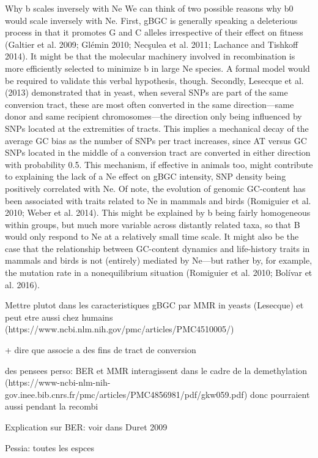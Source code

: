 Why b scales inversely with Ne
We can think of two possible reasons why b0 would scale inversely with Ne. First, gBGC is generally speaking a deleterious process in that it promotes G and C alleles irrespective of their effect on fitness (Galtier et al. 2009; Glémin 2010; Necşulea et al. 2011; Lachance and Tishkoff 2014). It might be that the molecular machinery involved in recombination is more efficiently selected to minimize b in large Ne species. A formal model would be required to validate this verbal hypothesis, though. Secondly, Lesecque et al. (2013) demonstrated that in yeast, when several SNPs are part of the same conversion tract, these are most often converted in the same direction—same donor and same recipient chromosomes—the direction only being influenced by SNPs located at the extremities of tracts. This implies a mechanical decay of the average GC bias as the number of SNPs per tract increases, since AT versus GC SNPs located in the middle of a conversion tract are converted in either direction with probability 0.5. This mechanism, if effective in animals too, might contribute to explaining the lack of a Ne effect on gBGC intensity, SNP density being positively correlated with Ne. Of note, the evolution of genomic GC-content has been associated with traits related to Ne in mammals and birds (Romiguier et al. 2010; Weber et al. 2014). This might be explained by b being fairly homogeneous within groups, but much more variable across distantly related taxa, so that B would only respond to Ne at a relatively small time scale. It might also be the case that the relationship between GC-content dynamics and life-history traits in mammals and birds is not (entirely) mediated by Ne—but rather by, for example, the mutation rate in a nonequilibrium situation (Romiguier et al. 2010; Bolívar et al. 2016).






Mettre plutot dans les caracteristiques
gBGC par MMR in yeasts (Lesecque)
et peut etre aussi chez humains (https://www.ncbi.nlm.nih.gov/pmc/articles/PMC4510005/)

+ dire que associe a des fins de tract de conversion

des pensees perso:
BER et MMR interagissent dans le cadre de la demethylation (https://www-ncbi-nlm-nih-gov.inee.bib.cnrs.fr/pmc/articles/PMC4856981/pdf/gkw059.pdf) donc pourraient aussi pendant la recombi

Explication sur BER\@: voir dans Duret 2009

Pessia: toutes les espces


